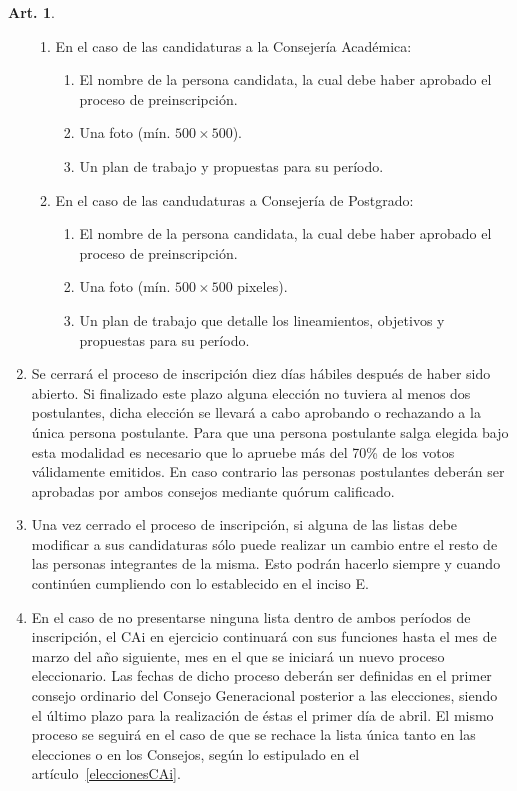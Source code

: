 \documentclass[letterpaper,11pt]{article}
\theoremstyle{definition}%
\newtheorem{art}{Art.} %
\begin{document}
\begin{art}
\begin{enumerate}
\begin{enumerate}
			      \item En el caso de las candidaturas a la Consejería Académica:
			            \begin{enumerate}
				            \item El nombre de la persona candidata, la cual debe haber aprobado el proceso de preinscripción.
				            \item Una foto (mín. $500 \times 500$).
				            \item Un plan de trabajo y propuestas para su período.
			            \end{enumerate}

			      \item En el caso de las candudaturas a Consejería de Postgrado:
			            \begin{enumerate}
				            \item El nombre de la persona candidata, la cual debe haber aprobado el proceso de preinscripción.
				            \item Una foto (mín. $500 \times 500$ pixeles).
				            \item Un plan de trabajo que detalle los lineamientos, objetivos y propuestas para su período.
			            \end{enumerate}
		      \end{enumerate}

		\item\label{cierre}Se cerrará el proceso de inscripción diez días hábiles después de haber sido abierto. Si finalizado este plazo alguna elección no tuviera al menos dos postulantes, dicha elección se llevará a cabo aprobando o rechazando a la única persona postulante. Para que una persona postulante salga elegida bajo esta modalidad es necesario que lo apruebe más del 70\% de los votos válidamente emitidos. En caso contrario las personas postulantes deberán ser aprobadas por ambos consejos mediante quórum calificado.

		\item Una vez cerrado el proceso de inscripción, si alguna de las listas debe modificar a sus candidaturas sólo puede realizar un cambio entre el resto de las personas integrantes de la misma. Esto podrán hacerlo siempre y cuando continúen cumpliendo con lo establecido en el inciso E.

		\item En el caso de no presentarse ninguna lista dentro de ambos períodos de inscripción, el CAi en ejercicio continuará con sus funciones hasta el mes de marzo del año siguiente, mes en el que se iniciará un nuevo proceso eleccionario. Las fechas de dicho proceso deberán ser definidas en  el primer consejo ordinario del Consejo Generacional posterior a las elecciones, siendo el último plazo para la realización de éstas el primer día de abril. El mismo proceso se seguirá en el caso de que se rechace la lista única tanto en las elecciones o en los Consejos, según lo estipulado en el artículo~\ref{eleccionesCAi}.


\end{enumerate}
\end{art}
\end{document}
